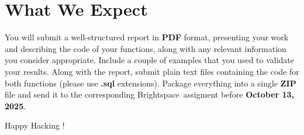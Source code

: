 \documentclass{article}
\begin{document}
\section{What We Expect}
You will submit a well-structured report in \textbf{PDF} format, presenting your work and describing the code of your functions, along with any relevant information you consider appropriate. Include a couple of examples that you used to validate your results. Along with the report, submit plain text files containing the code for both functions (please use \textbf{.sql} extensions). Package everything into a single \textbf{ZIP} file and send it to the corresponding Brightspace\texttrademark ~assigment before \textbf{October 13, 2025}.

\vspace{5mm}
Happy Hacking !
\end{document}
